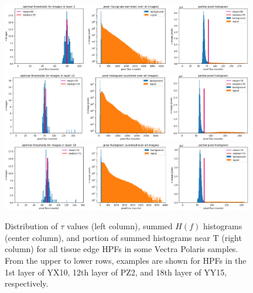 \documentclass[letterpaper,11pt]{article}
\newcommand{\Tau}{\mathrm{T}}
\begin{document}
\begin{figure}[!ht]
\centering
\includegraphics[width=0.98\textwidth]{images/masking/YX10_layer_1_background_threshold_plots}
\includegraphics[width=0.98\textwidth]{images/masking/PZ2_layer_12_background_threshold_plots}
\includegraphics[width=0.98\textwidth]{images/masking/YY15_layer_18_background_threshold_plots}
\caption{\footnotesize Distribution of $\tau$ values (left column), summed $H(f)$ histograms (center column), and portion of summed histograms near $\Tau$ (right column) for all tissue edge HPFs in some Vectra Polaris samples. From the upper to lower rows, examples are shown for HPFs in the 1st layer of YX10, 12th layer of PZ2, and 18th layer of YY15, respectively.}
\label{fig:threshold_distributions_polaris_1}
\end{figure}
\end{document}
